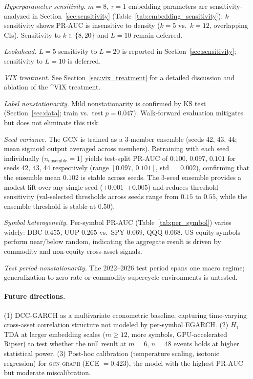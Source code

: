 \documentclass[sigconf]{acmart}
\begin{document}
\textit{Hyperparameter sensitivity.} $m{=}8$, $\tau{=}1$ embedding parameters
are sensitivity-analyzed in Section~\ref{sec:sensitivity}
(Table~\ref{tab:embedding_sensitivity}). $k$ sensitivity shows PR-AUC is
insensitive to density ($k{=}5$ vs.\ $k{=}12$, overlapping CIs).
Sensitivity to $k \in \{8,20\}$ and $L{=}10$ remain deferred.

\textit{Lookahead.} $L{=}5$ sensitivity to $L{=}20$ is reported in
Section~\ref{sec:sensitivity}; sensitivity to $L{=}10$ is deferred.

\textit{VIX treatment.} See Section~\ref{sec:vix_treatment} for a detailed
discussion and ablation of the \^{}VIX treatment.

\textit{Label nonstationarity.} Mild nonstationarity is confirmed by KS test
(Section~\ref{sec:data}; train vs.\ test $p{=}0.047$). Walk-forward
evaluation mitigates but does not eliminate this risk.

\textit{Seed variance.}
The GCN is trained as a 3-member ensemble (seeds 42, 43, 44; mean sigmoid output
averaged across members). Retraining with each seed individually ($n_\mathrm{ensemble}=1$)
yields test-split PR-AUC of $0.100$, $0.097$, $0.101$ for seeds 42, 43, 44
respectively (range $[0.097,\, 0.101]$, std $= 0.002$), confirming that the
ensemble mean $0.102$ is stable across seeds.
The 3-seed ensemble provides a modest lift over any single seed ($+0.001$--$+0.005$)
and reduces threshold sensitivity (val-selected thresholds across seeds range from
$0.15$ to $0.55$, while the ensemble threshold is stable at $0.50$).

\textit{Symbol heterogeneity.}
Per-symbol PR-AUC (Table~\ref{tab:per_symbol}) varies widely: DBC $0.455$,
UUP $0.265$ vs.\ SPY $0.069$, QQQ $0.068$.
US equity symbols perform near/below random, indicating the aggregate result is
driven by commodity and non-equity cross-asset signals.

\textit{Test period nonstationarity.} The 2022--2026 test period spans one
macro regime; generalization to zero-rate or commodity-supercycle environments
is untested.

\paragraph{Future directions.}
(1) DCC-GARCH \cite{engle2002dcc} as a multivariate econometric baseline,
capturing time-varying cross-asset correlation structure not modeled by
per-symbol EGARCH.
(2) $H_1$ TDA at larger embedding scales ($m \geq 12$, more symbols,
GPU-accelerated Ripser) to test whether the null result at $m{=}6$,
$n{=}48$ events holds at higher statistical power.
(3) Post-hoc calibration (temperature scaling, isotonic regression) for
\textsc{gcn-graph} (ECE $= 0.423$), the model with the highest PR-AUC
but moderate miscalibration.
\end{document}
